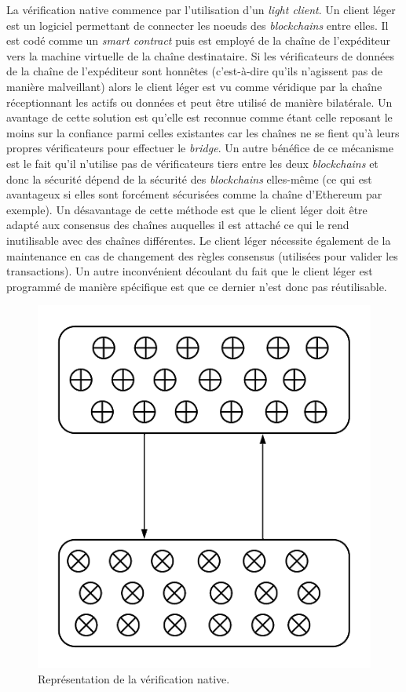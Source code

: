 La vérification native commence par l’utilisation d’un \textit{light client}\cite{NomadDocsNative}. Un client léger est un logiciel permettant de connecter les noeuds des \textit{\gls{blockchain}s} entre elles. Il est codé comme un \textit{\gls{smart contract}} puis est employé de la chaîne de l'expéditeur vers la machine virtuelle de la chaîne destinataire. Si les vérificateurs de données de la chaîne de l'expéditeur sont honnêtes (c’est-à-dire qu’ils n’agissent pas de manière malveillant) alors le client léger est vu comme véridique par la chaîne réceptionnant les \gls{actif}s ou données et peut être utilisé de manière bilatérale.
 Un avantage de cette solution est qu’elle est reconnue comme étant celle reposant le moins sur la confiance parmi celles existantes car les chaînes ne se fient qu’à leurs propres vérificateurs pour effectuer le \textit{bridge}. Un autre bénéfice de ce mécanisme est le fait qu’il n’utilise pas de vérificateurs tiers entre les deux \textit{\gls{blockchain}s} et donc la sécurité dépend de la sécurité des \textit{\gls{blockchain}s} elles-même (ce qui est avantageux si elles sont forcément sécurisées comme la chaîne d’Ethereum par exemple).
 Un désavantage de cette méthode est que le client léger doit être adapté aux consensus des chaînes auquelles il est attaché ce qui le rend inutilisable avec des chaînes différentes. Le client léger nécessite également de la maintenance en cas de changement des règles consensus (utilisées pour valider les transactions). Un autre inconvénient découlant du fait que le client léger est programmé de manière spécifique est que ce dernier n’est donc pas réutilisable. \\
 \begin{figure}[h!]
    \centering
\includegraphics[scale=0.50]{centralisation/imagesBridges/DiagrammeVerifNative.png}
\caption{Représentation de la vérification native.}
\label{fig:NativeVerif}
\end{figure}

